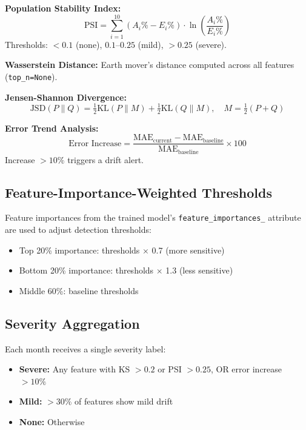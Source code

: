 \documentclass[conference]{IEEEtran}
\begin{document}
\textbf{Population Stability Index:}
\begin{equation}
\text{PSI} = \sum_{i=1}^{10} (A_i\% - E_i\%) \cdot \ln\!\left(\frac{A_i\%}{E_i\%}\right)
\end{equation}
Thresholds: $< 0.1$ (none), $0.1$--$0.25$ (mild), $> 0.25$ (severe).

\textbf{Wasserstein Distance:} Earth mover's distance computed across all features (\texttt{top\_n=None}).

\textbf{Jensen-Shannon Divergence:}
\begin{equation}
\text{JSD}(P\|Q) = \tfrac{1}{2}\text{KL}(P\|M) + \tfrac{1}{2}\text{KL}(Q\|M), \quad M = \tfrac{1}{2}(P+Q)
\end{equation}

\textbf{Error Trend Analysis:}
\begin{equation}
\text{Error Increase} = \frac{\text{MAE}_{\text{current}} - \text{MAE}_{\text{baseline}}}{\text{MAE}_{\text{baseline}}} \times 100
\end{equation}
Increase $> 10\%$ triggers a drift alert.

\subsection{Feature-Importance-Weighted Thresholds}

Feature importances from the trained model's \texttt{feature\_importances\_} attribute are used to adjust detection thresholds:

\begin{itemize}
    \item Top 20\% importance: thresholds $\times$ 0.7 (more sensitive)
    \item Bottom 20\% importance: thresholds $\times$ 1.3 (less sensitive)
    \item Middle 60\%: baseline thresholds
\end{itemize}

\subsection{Severity Aggregation}

Each month receives a single severity label:
\begin{itemize}
    \item \textbf{Severe:} Any feature with KS $> 0.2$ or PSI $> 0.25$, OR error increase $> 10\%$
    \item \textbf{Mild:} $> 30\%$ of features show mild drift
    \item \textbf{None:} Otherwise
\end{itemize}
\end{document}
